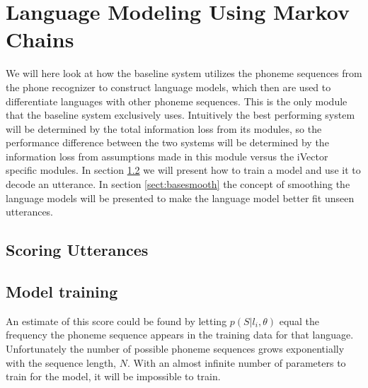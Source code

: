 \section{Language Modeling Using Markov Chains}

We will here look at how the baseline system utilizes the phoneme sequences from the phone recognizer to construct language models, which then are used to differentiate languages with other phoneme sequences. This is the only module that the baseline system exclusively uses. Intuitively the best performing system will be determined by the total information loss from its modules, so the performance difference between the two systems will be determined by the information loss from assumptions made in this module versus the iVector specific modules. In section \ref{sect:basetrain} we will present how to train a model and use it to decode an utterance. In section \ref{sect:basesmooth} the concept of smoothing the language models will be presented to make the language model better fit unseen utterances.

\subsection{Scoring Utterances}
\label{sect:basescore}

\subsection{Model training}
\label{sect:basetrain}

An estimate of this score could be found by letting $p(S|l_i, \theta)$ equal the frequency the phoneme sequence appears in the training data for that language. Unfortunately the number of possible phoneme sequences grows exponentially with the sequence length, $N$. With an almost infinite number of parameters to train for the model, it will be impossible to train. 

